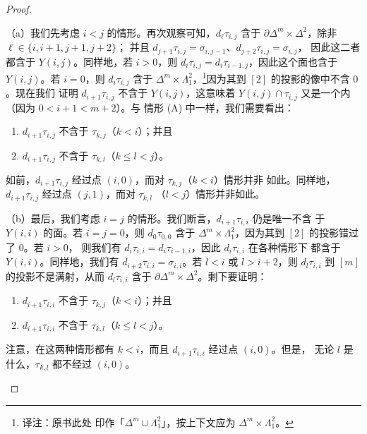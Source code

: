 \begin{proof}
\begin{itemize}
（a）我们先考虑 $i < j$ 的情形。再次观察可知，$d_\ell\tau_{i,j}$ 含于
$\partial\Delta^m \times \Delta^2$，除非 $\ell \in \{i, i + 1, j + 1, j + 2\}$；
并且 $d_{j+1}\tau_{i,j} = \sigma_{i,j-1}$、$d_{j+2}\tau_{i,j} = \sigma_{i,j}$，
因此这二者都含于 $Y(i, j)$。同样地，若 $i > 0$，则
$d_i\tau_{i,j} = d_i\tau_{i-1,j}$，因此这个面也含于 $Y(i, j)$。若 $i = 0$，则
$d_i\tau_{i,j}$ 含于 $\Delta^m \times \Lambda^2_1$，\footnote{译注：原书此处
印作「$\Delta^m \cup \Lambda^2_1$」，按上下文应为
$\Delta^m \times \Lambda^2_1$。}因为其到 $[2]$ 的投影的像中不含 $0$。现在我们
证明 $d_{i+1}\tau_{i,j}$ 不含于 $Y(i, j)$，这意味着
$Y(i, j) \cap \tau_{i,j}$ 又是一个内\trHorn{}（因为 $0 < i + 1 < m + 2$）。与
情形 (A) 中一样，我们需要看出：
\begin{enumerate}[label=(\arabic*)]
  \item $d_{i+1}\tau_{i,j}$ 不含于 $\tau_{k,j}$（$k < i$）；并且
  \item $d_{i+1}\tau_{i,j}$ 不含于 $\tau_{k,l}$（$k \le l < j$）。
\end{enumerate}
如前，$d_{i+1}\tau_{i,j}$ 经过点 $(i, 0)$，而对 $\tau_{k,j}$（$k < i$）情形并非
如此。同样地，$d_{i+1}\tau_{i,j}$ 经过点 $(j, 1)$，而对 $\tau_{k,l}$
（$l < j$）情形并非如此。

（b）最后，我们考虑 $i = j$ 的情形。我们断言，$d_{i+1}\tau_{i,i}$ 仍是唯一不含
于 $Y(i, i)$ 的面。若 $i = j = 0$，则 $d_0\tau_{0,0}$ 含于
$\Delta^m \times \Lambda^2_1$，因为其到 $[2]$ 的投影错过了 $0$。若 $i > 0$，
则我们有 $d_i\tau_{i,i} = d_i\tau_{i-1,i}$，因此 $d_i\tau_{i,i}$ 在各种情形下
都含于 $Y(i, i)$。同样地，我们有 $d_{i+2}\tau_{i,i} = \sigma_{i,i}$。若
$l < i$ 或 $l > i + 2$，则 $d_l\tau_{i,i}$ 到 $[m]$ 的投影不是满射，从而
$d_l\tau_{i,i}$ 含于 $\partial\Delta^m \times \Delta^2$。剩下要证明：
\begin{enumerate}[label=(\arabic*)]
  \item $d_{i+1}\tau_{i,i}$ 不含于 $\tau_{k,j}$（$k < i$）；并且
  \item $d_{i+1}\tau_{i,i}$ 不含于 $\tau_{k,l}$（$k \le l < j$）。
\end{enumerate}
注意，在这两种情形都有 $k < i$，而且 $d_{i+1}\tau_{i,i}$ 经过点 $(i, 0)$。但是，
无论 $l$ 是什么，$\tau_{k,l}$ 都不经过 $(i, 0)$。
\end{itemize}
\end{proof}

